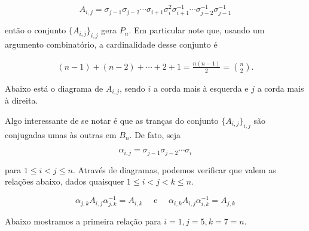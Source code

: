 \documentclass[a4paper,portuguese,11pt,twoside, leqno]{book}
\makeatletter
\newcounter{braid}
\newcounter{strands}
\def\cross{%
	\@ifnextchar^{\message{Got sup}\cross@sup}{\cross@sub}}
\def\cross@sup^#1_#2{\render@cross{#2}{#1}}
\def\cross@sub_#1{\@ifnextchar^{\cross@@sub{#1}}{\render@cross{#1}{1}}}
\def\cross@@sub#1^#2{\render@cross{#1}{#2}}
\def\render@cross#1#2{
	\def\strand{#1}
	\def\crossing{#2}
	\pgfmathsetmacro{\cross@y}{-\value{braid}*\braid@h}
	\pgfmathtruncatemacro{\nextstrand}{#1+1}
	\foreach \thread in {1,...,\value{strands}}
	{
		\pgfmathsetmacro{\strand@x}{\thread * \braid@w}
		\ifnum\thread=\strand
		\pgfmathsetmacro{\over@x}{\strand * \braid@w + .5*(1 - \crossing) * \braid@w}
		\pgfmathsetmacro{\under@x}{\strand * \braid@w + .5*(1 + \crossing) * \braid@w}
		\draw[braid] \pgfkeysvalueof{/tikz/braid start} +(\under@x pt,\cross@y pt) to[out=-90,in=90] +(\over@x pt,\cross@y pt -\braid@h);
		\draw[braid] \pgfkeysvalueof{/tikz/braid start} +(\over@x pt,\cross@y pt) to[out=-90,in=90] +(\under@x pt,\cross@y pt -\braid@h);
		\else
		\ifnum\thread=\nextstrand
		\else
		\draw[braid] \pgfkeysvalueof{/tikz/braid start} ++(\strand@x pt,\cross@y pt) -- ++(0,-\braid@h);
		\fi
		\fi
	}
	\stepcounter{braid}
}
\newcommand{\braid}[2][]{%
	\begingroup
	\pgfkeys{/tikz/strands=2}
	\tikzset{#1}
	\pgfkeysgetvalue{/tikz/braid width}{\braid@w}
	\pgfkeysgetvalue{/tikz/braid height}{\braid@h}
	\setcounter{braid}{0}
	\let\sigma=\cross
	#2
	\endgroup
}
\theoremstyle{definition}
\makeatother
\begin{document}
	\begin{equation*}
	\tag{Geradores de Artin}
	\label{geradores de Artin}
	A_{i,j} = \sigma_{j-1}\sigma_{j-2}\cdots\sigma_{i+1}\sigma_i^2\sigma_{i+1}^{-1}\cdots\sigma_{j-2}^{-1}\sigma_{j-1}^{-1} 
	\end{equation*}
	
	\vspace{0.3cm} então o conjunto $\{ A_{i,j} \}_{i,j}$ gera $P_n$. Em particular note que, usando um argumento combinatório, a cardinalidade desse conjunto é
	
	\begin{align*}
	(n-1) + (n-2) + \cdots + 2 + 1 = \frac{n(n-1)}{2} = \binom{n}{2}.
	\end{align*}
	
	\par\vspace{0.3cm} Abaixo está o diagrama de $A_{i,j}$, sendo $i$ a corda mais à esquerda e $j$ a corda mais à direita.
	\begin{center}
	\end{center}
	
	\par\vspace{0.3cm} Algo interessante de se notar é que as tranças do conjunto $\{A_{i,j}\}_{i,j}$ são conjugadas umas às outras em $B_n$. De fato, seja
	
	$$\alpha_{i,j} = \sigma_{j-1}\sigma_{j-2}\cdots\sigma_i$$
	
	\vspace{0.3cm} para $1\leq i<j\leq n$. Através de diagramas, podemos verificar que valem as relações abaixo, dados quaisquer $1\leq i<j<k\leq n$.
	
	\begin{equation*}
	\alpha_{j,k}A_{i,j}\alpha_{j,k}^{-1} = A_{i,k} \quad\text{ e }\quad \alpha_{i,k}A_{i,j}\alpha_{i,k}^{-1} = A_{j,k}
	\end{equation*}
	
	\par\vspace{0.3cm} Abaixo mostramos a primeira relação para $i=1, j=5, k=7=n$.
	\begin{center}
	\end{center}
	
\end{document}
